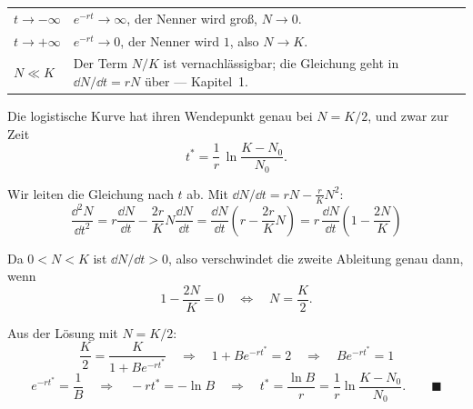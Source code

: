 \begin{merksatz}
\begin{center}
{\small
\renewcommand{\arraystretch}{1.55}
\begin{tabular}{@{}P{2.6cm}P{6.0cm}@{}}
\toprule
\textbf{$t \to -\infty$} & $e^{-rt} \to \infty$, der Nenner wird groß, $N \to 0$.\\
\textbf{$t \to +\infty$} & $e^{-rt} \to 0$, der Nenner wird $1$, also $N \to K$.\\
\textbf{$N \ll K$} & Der Term $N/K$ ist vernachlässigbar; die Gleichung geht in $\dd N/\dd t = rN$ über --- Kapitel~1.\\
\bottomrule
\end{tabular}}
\end{center}

\begin{center}
\begin{minipage}{0.88\textwidth}
\end{minipage}
\end{center}
\end{merksatz}

\begin{merksatz}
Die logistische Kurve hat ihren Wendepunkt genau bei $N = K/2$, und zwar zur Zeit
\[ t^{*} = \frac{1}{r}\,\ln\frac{K-N_0}{N_0} . \]

Wir leiten die Gleichung nach $t$ ab. Mit $\dd N/\dd t = rN - \frac{r}{K}N^2$:
\[ \frac{\dd^2N}{\dd t^2} = r\frac{\dd N}{\dd t} - \frac{2r}{K}N\frac{\dd N}{\dd t} = \frac{\dd N}{\dd t}\left(r - \frac{2r}{K}N\right) = r\,\frac{\dd N}{\dd t}\left(1 - \frac{2N}{K}\right) \]

Da $0 < N < K$ ist $\dd N/\dd t > 0$, also verschwindet die zweite Ableitung genau dann, wenn
\[ 1 - \frac{2N}{K} = 0 \quad\Longleftrightarrow\quad N = \frac{K}{2} . \]

Aus der Lösung mit $N = K/2$:
\[ \frac{K}{2} = \frac{K}{1+Be^{-rt^*}} \quad\Longrightarrow\quad 1+Be^{-rt^*} = 2 \quad\Longrightarrow\quad Be^{-rt^*} = 1 \]
\[ e^{-rt^*} = \frac{1}{B} \quad\Longrightarrow\quad -rt^* = -\ln B \quad\Longrightarrow\quad t^* = \frac{\ln B}{r} = \frac{1}{r}\ln\frac{K-N_0}{N_0} . \qquad \blacksquare \]

\begin{center}
\begin{minipage}{0.88\textwidth}
\end{minipage}
\end{center}
\end{merksatz}

